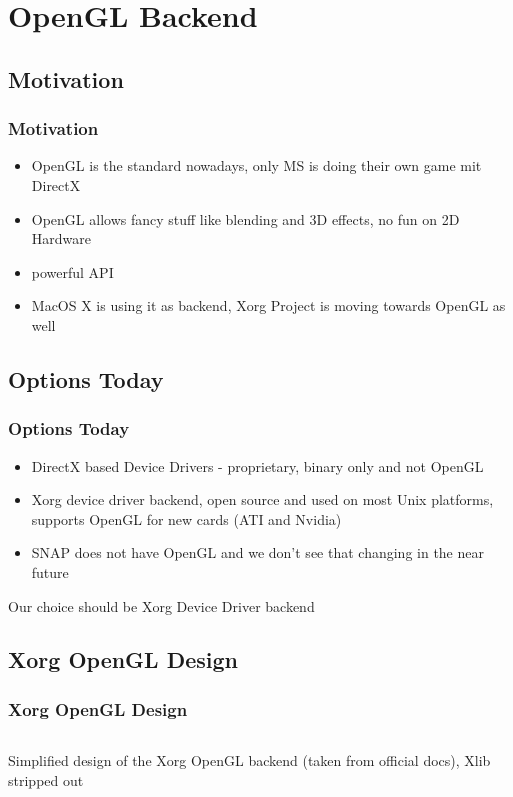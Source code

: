 \documentclass{beamer}
\begin{document}
\section{OpenGL Backend}

\subsection{Motivation}
\begin{frame}
\frametitle{Motivation}
\begin{itemize}
  \item OpenGL is the standard nowadays, only MS is doing their own game mit DirectX
  \item OpenGL allows fancy stuff like blending and 3D effects, no fun on 2D Hardware
  \item powerful API
  \item MacOS X is using it as backend, Xorg Project is moving towards OpenGL as well
\end{itemize}
\end{frame}

\subsection{Options Today}
\begin{frame}
\frametitle{Options Today}
\begin{itemize}
  \item DirectX based Device Drivers - proprietary, binary only and not OpenGL
  \item Xorg device driver backend, open source and used on most Unix platforms, supports OpenGL for new cards (ATI and Nvidia)
  \item SNAP does not have OpenGL and we don't see that changing in the near future
\end{itemize}
Our choice should be Xorg Device Driver backend
\end{frame}

\subsection{Xorg OpenGL Design}
\begin{frame}
\frametitle{Xorg OpenGL Design}
\begin{columns}
\column[T]{5cm}
\column{5cm}
Simplified design of the Xorg OpenGL backend (taken from official docs), Xlib stripped out
\end{columns}
\end{frame}
\end{document}
